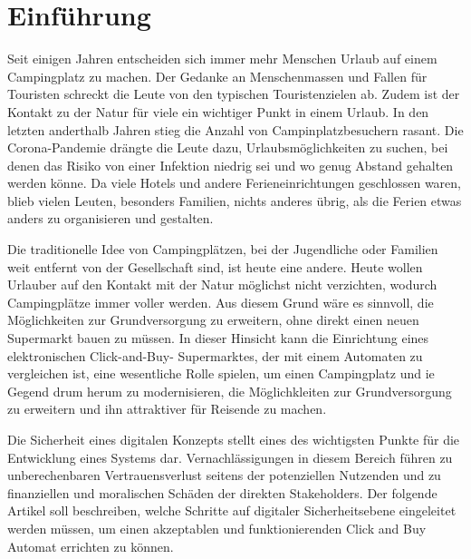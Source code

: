 \section{Einführung}



Seit einigen Jahren entscheiden sich immer mehr Menschen Urlaub auf einem Campingplatz 
zu machen. Der Gedanke an Menschenmassen und Fallen für Touristen schreckt die Leute von
den typischen Touristenzielen ab. Zudem ist der Kontakt zu der Natur für viele ein wichtiger
Punkt in einem Urlaub. In den letzten anderthalb Jahren stieg die Anzahl von Campinplatzbesuchern
rasant. Die Corona-Pandemie drängte die Leute dazu, Urlaubsmöglichkeiten zu suchen, bei denen
das Risiko von einer Infektion niedrig sei und wo genug Abstand gehalten werden könne. Da viele 
Hotels und andere Ferieneinrichtungen geschlossen waren, blieb vielen Leuten, besonders Familien,
nichts anderes übrig, als die Ferien etwas anders zu organisieren und gestalten.

Die traditionelle Idee von Campingplätzen, bei der Jugendliche oder Familien weit entfernt von der 
Gesellschaft sind, ist heute eine andere. Heute wollen Urlauber auf den Kontakt mit der Natur
möglichst nicht verzichten, wodurch Campingplätze immer voller werden. Aus diesem Grund wäre es
sinnvoll, die Möglichkeiten zur Grundversorgung zu erweitern, ohne direkt einen neuen Supermarkt
bauen zu müssen. In dieser Hinsicht kann die Einrichtung eines elektronischen Click-and-Buy-
Supermarktes, der mit einem Automaten zu vergleichen ist, eine wesentliche Rolle spielen, um 
einen Campingplatz und ie Gegend drum herum zu modernisieren, die Möglichkleiten zur Grundversorgung zu erweitern und 
ihn attraktiver für Reisende zu machen.

Die Sicherheit eines digitalen Konzepts stellt eines des wichtigsten Punkte für die Entwicklung
eines Systems dar. Vernachlässigungen in diesem Bereich führen zu unberechenbaren Vertrauensverlust 
seitens der potenziellen Nutzenden und zu finanziellen und moralischen Schäden der direkten
Stakeholders. Der folgende Artikel soll beschreiben, welche Schritte auf digitaler Sicherheitsebene eingeleitet 
werden müssen, um einen akzeptablen und funktionierenden Click and Buy Automat errichten zu können. 